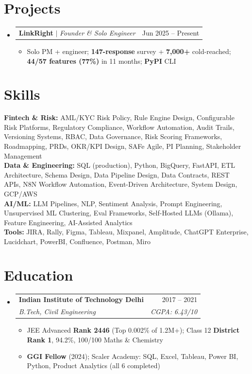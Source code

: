 \documentclass[a4paper,10pt]{article}
\makeatletter
\newcommand{\resumeItem}[1]{
  \item\small{#1\vspace{-2pt}}
}
\newcommand{\resumeSubheading}[4]{
  \vspace{-2pt}\item
  \begin{tabular*}{0.97\textwidth}[t]{l@{\extracolsep{\fill}}r}
    \textbf{#1} & #2 \\
    \textit{\small#3} & \textit{\small #4} \\
  \end{tabular*}\vspace{-7pt}
}
\newcommand{\resumeProjectHeading}[2]{
  \item
  \begin{tabular*}{0.97\textwidth}{l@{\extracolsep{\fill}}r}
    \small#1 & #2 \\
  \end{tabular*}\vspace{-7pt}
}
\newcommand{\resumeSubHeadingListStart}{\begin{itemize}[leftmargin=0.15in, label={}]}
\newcommand{\resumeSubHeadingListEnd}{\end{itemize}}
\newcommand{\resumeItemListStart}{\begin{itemize}\parfillskip=0pt}
\newcommand{\resumeItemListEnd}{\end{itemize}\vspace{-5pt}}
\makeatother
\begin{document}
\section{Projects}
\resumeSubHeadingListStart
  \resumeProjectHeading
    {\textbf{LinkRight} $|$ \emph{Founder \& Solo Engineer}}{Jun 2025 -- Present}
  \resumeItemListStart
    \resumeItem{Solo PM + engineer; \textbf{147-response} survey + \textbf{7,000+} cold-reached; \textbf{44/57 features (77\%)} in 11 months; \textbf{PyPI} CLI}
  \resumeItemListEnd
\resumeSubHeadingListEnd

\section{Skills}
\begin{itemize}[leftmargin=0.15in, label={}]
  \small{\item{
    \textbf{Fintech \& Risk:}{ AML/KYC Risk Policy, Rule Engine Design, Configurable Risk Platforms, Regulatory Compliance, Workflow Automation, Audit Trails, Versioning Systems, RBAC, Data Governance, Risk Scoring Frameworks, Roadmapping, PRDs, OKR/KPI Design, SAFe Agile, PI Planning, Stakeholder Management} \\
    \textbf{Data \& Engineering:}{ SQL (production), Python, BigQuery, FastAPI, ETL Architecture, Schema Design, Data Pipeline Design, Data Contracts, REST APIs, N8N Workflow Automation, Event-Driven Architecture, System Design, GCP/AWS} \\
    \textbf{AI/ML:}{ LLM Pipelines, NLP, Sentiment Analysis, Prompt Engineering, Unsupervised ML Clustering, Eval Frameworks, Self-Hosted LLMs (Ollama), Feature Engineering, AI-Assisted Analytics} \\
    \textbf{Tools:}{ JIRA, Rally, Figma, Tableau, Mixpanel, Amplitude, ChatGPT Enterprise, Lucidchart, PowerBI, Confluence, Postman, Miro}
  }}
\end{itemize}

\section{Education}
\resumeSubHeadingListStart
  \resumeSubheading
    {Indian Institute of Technology Delhi}{2017 -- 2021}
    {B.Tech, Civil Engineering}{CGPA: 6.43/10}
  \resumeItemListStart
    \resumeItem{JEE Advanced \textbf{Rank 2446} (Top 0.002\% of 1.2M+); Class 12 \textbf{District Rank 1}, 94.2\%, 100/100 Maths \& Chemistry}
    \resumeItem{\textbf{GGI Fellow} (2024); Scaler Academy: SQL, Excel, Tableau, Power BI, Python, Product Analytics (all 6 completed)}
  \resumeItemListEnd
\resumeSubHeadingListEnd
\end{document}
